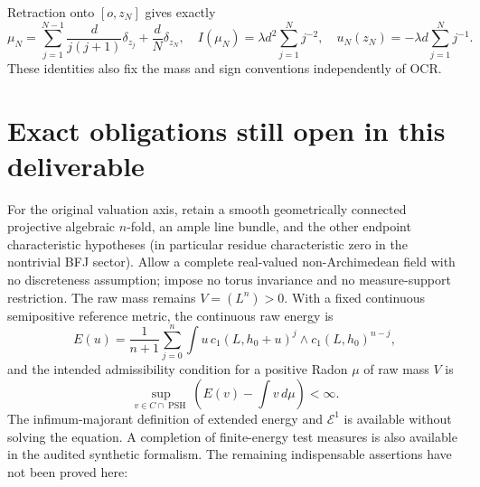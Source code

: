 \documentclass[
  11pt,
]{article}
\begin{document}
Retraction onto \([o,z_N]\) gives exactly \[
\mu_N=\sum_{j=1}^{N-1}\frac{d}{j(j+1)}\delta_{z_j}
+\frac dN\delta_{z_N},\quad
I(\mu_N)=\lambda d^2\sum_{j=1}^N j^{-2},\quad
u_N(z_N)=-\lambda d\sum_{j=1}^N j^{-1}.
\] These identities also fix the mass and sign conventions independently
of OCR.

\section{Exact obligations still open in this
deliverable}\label{exact-obligations-still-open-in-this-deliverable}

For the original valuation axis, retain a smooth geometrically connected
projective algebraic \(n\)-fold, an ample line bundle, and the other
endpoint characteristic hypotheses (in particular residue characteristic
zero in the nontrivial BFJ sector). Allow a complete real-valued
non-Archimedean field with no discreteness assumption; impose no torus
invariance and no measure-support restriction. The raw mass remains
\(V=(L^n)>0\). With a fixed continuous semipositive reference metric,
the continuous raw energy is \[
E(u)=\frac1{n+1}\sum_{j=0}^n\int u\,
c_1(L,h_0+u)^j\wedge c_1(L,h_0)^{n-j},
\] and the intended admissibility condition for a positive Radon \(\mu\)
of raw mass \(V\) is \[
\sup_{v\in C\cap\operatorname{PSH}}
\left(E(v)-\int v\,d\mu\right)<\infty.
\] The infimum-majorant definition of extended energy and
\(\mathcal E^1\) is available without solving the equation. A completion
of finite-energy test measures is also available in the audited
synthetic formalism. The remaining indispensable assertions have not
been proved here:
\end{document}

